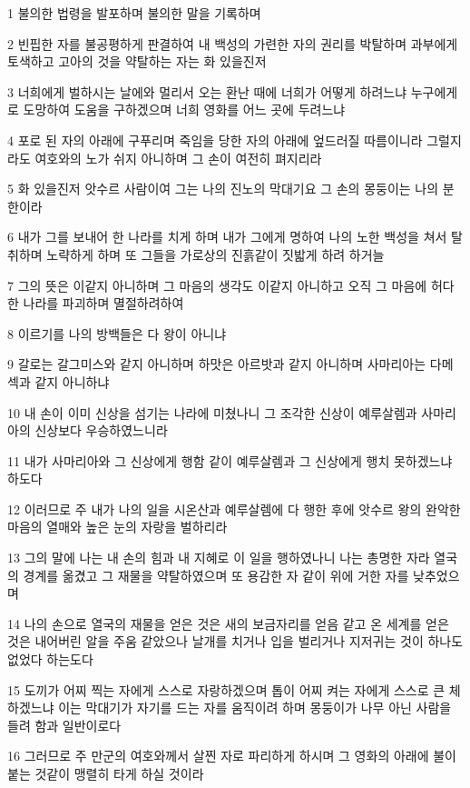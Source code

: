 \par 1 불의한 법령을 발포하며 불의한 말을 기록하며
\par 2 빈핍한 자를 불공평하게 판결하여 내 백성의 가련한 자의 권리를 박탈하며 과부에게 토색하고 고아의 것을 약탈하는 자는 화 있을진저
\par 3 너희에게 벌하시는 날에와 멀리서 오는 환난 때에 너희가 어떻게 하려느냐 누구에게로 도망하여 도움을 구하겠으며 너희 영화를 어느 곳에 두려느냐
\par 4 포로 된 자의 아래에 구푸리며 죽임을 당한 자의 아래에 엎드러질 따름이니라 그럴지라도 여호와의 노가 쉬지 아니하며 그 손이 여전히 펴지리라
\par 5 화 있을진저 앗수르 사람이여 그는 나의 진노의 막대기요 그 손의 몽둥이는 나의 분한이라
\par 6 내가 그를 보내어 한 나라를 치게 하며 내가 그에게 명하여 나의 노한 백성을 쳐서 탈취하며 노략하게 하며 또 그들을 가로상의 진흙같이 짓밟게 하려 하거늘
\par 7 그의 뜻은 이같지 아니하며 그 마음의 생각도 이같지 아니하고 오직 그 마음에 허다한 나라를 파괴하며 멸절하려하여
\par 8 이르기를 나의 방백들은 다 왕이 아니냐
\par 9 갈로는 갈그미스와 같지 아니하며 하맛은 아르밧과 같지 아니하며 사마리아는 다메섹과 같지 아니하냐
\par 10 내 손이 이미 신상을 섬기는 나라에 미쳤나니 그 조각한 신상이 예루살렘과 사마리아의 신상보다 우승하였느니라
\par 11 내가 사마리아와 그 신상에게 행함 같이 예루살렘과 그 신상에게 행치 못하겠느냐 하도다
\par 12 이러므로 주 내가 나의 일을 시온산과 예루살렘에 다 행한 후에 앗수르 왕의 완악한 마음의 열매와 높은 눈의 자랑을 벌하리라
\par 13 그의 말에 나는 내 손의 힘과 내 지혜로 이 일을 행하였나니 나는 총명한 자라 열국의 경계를 옮겼고 그 재물을 약탈하였으며 또 용감한 자 같이 위에 거한 자를 낮추었으며
\par 14 나의 손으로 열국의 재물을 얻은 것은 새의 보금자리를 얻음 같고 온 세계를 얻은 것은 내어버린 알을 주움 같았으나 날개를 치거나 입을 벌리거나 지저귀는 것이 하나도 없었다 하는도다
\par 15 도끼가 어찌 찍는 자에게 스스로 자랑하겠으며 톱이 어찌 켜는 자에게 스스로 큰 체 하겠느냐 이는 막대기가 자기를 드는 자를 움직이려 하며 몽둥이가 나무 아닌 사람을 들려 함과 일반이로다
\par 16 그러므로 주 만군의 여호와께서 살찐 자로 파리하게 하시며 그 영화의 아래에 불이 붙는 것같이 맹렬히 타게 하실 것이라
